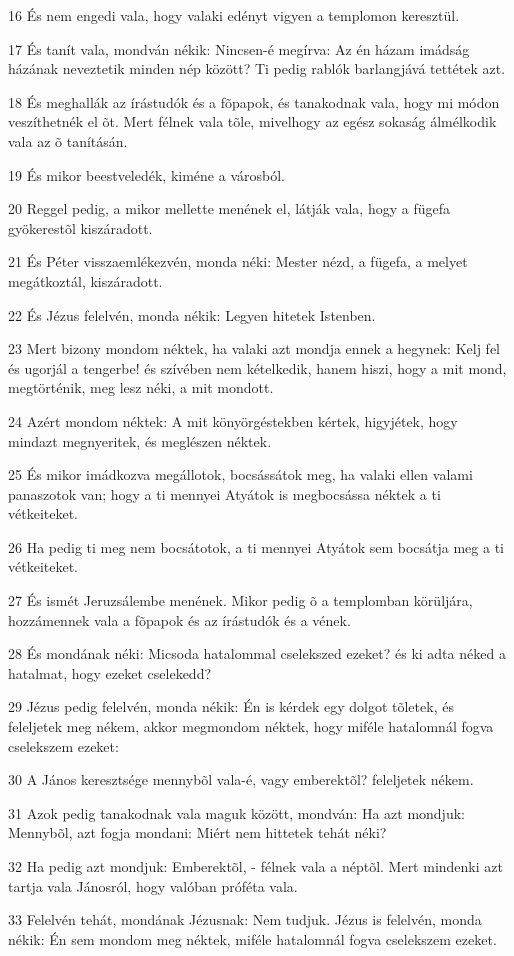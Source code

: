 \par 16 És nem engedi vala, hogy valaki edényt vigyen a templomon keresztül.
\par 17 És tanít vala, mondván nékik: Nincsen-é megírva: Az én házam imádság házának neveztetik minden nép között? Ti pedig  rablók barlangjává tettétek azt.
\par 18 És meghallák az írástudók és a fõpapok, és tanakodnak vala, hogy mi módon veszíthetnék el õt. Mert félnek vala tõle, mivelhogy az egész sokaság álmélkodik vala az õ tanításán.
\par 19 És mikor beestveledék, kiméne a városból.
\par 20 Reggel pedig, a mikor mellette menének el, látják vala, hogy a fügefa gyökerestõl kiszáradott.
\par 21 És Péter visszaemlékezvén, monda néki: Mester nézd, a fügefa, a melyet megátkoztál, kiszáradott.
\par 22 És Jézus felelvén, monda nékik: Legyen hitetek Istenben.
\par 23 Mert bizony mondom néktek, ha valaki azt mondja ennek a hegynek: Kelj fel és ugorjál a tengerbe! és szívében nem kételkedik, hanem hiszi, hogy a mit mond, megtörténik, meg lesz néki, a mit mondott.
\par 24 Azért mondom néktek: A mit könyörgéstekben kértek, higyjétek, hogy mindazt megnyeritek, és meglészen néktek.
\par 25 És mikor imádkozva megállotok, bocsássátok meg, ha valaki ellen valami panaszotok van; hogy a ti mennyei Atyátok is megbocsássa néktek a ti vétkeiteket.
\par 26 Ha pedig ti meg nem bocsátotok, a ti mennyei Atyátok sem bocsátja meg a ti vétkeiteket.
\par 27 És ismét Jeruzsálembe menének. Mikor pedig õ a templomban körüljára, hozzámennek vala a fõpapok és az írástudók és a vének.
\par 28 És mondának néki: Micsoda hatalommal cselekszed ezeket? és ki adta néked a hatalmat, hogy ezeket cselekedd?
\par 29 Jézus pedig felelvén, monda nékik: Én is kérdek egy dolgot tõletek, és feleljetek meg nékem, akkor megmondom néktek, hogy miféle hatalomnál fogva cselekszem ezeket:
\par 30 A János keresztsége mennybõl vala-é, vagy emberektõl? feleljetek nékem.
\par 31 Azok pedig tanakodnak vala maguk között, mondván: Ha azt mondjuk: Mennybõl, azt fogja mondani: Miért nem hittetek tehát néki?
\par 32 Ha pedig azt mondjuk: Emberektõl, - félnek vala a néptõl. Mert mindenki azt tartja vala Jánosról, hogy valóban próféta vala.
\par 33 Felelvén tehát, mondának Jézusnak: Nem tudjuk. Jézus is felelvén, monda nékik: Én sem mondom meg néktek, miféle hatalomnál fogva cselekszem ezeket.

